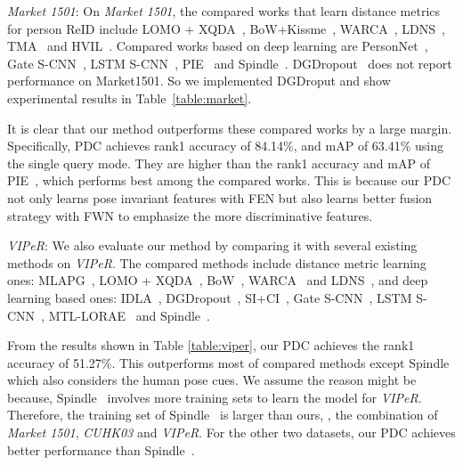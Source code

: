 \documentclass[10pt,twocolumn,letterpaper]{article}
\begin{document}
{\emph{Market 1501}:}
On \emph{Market 1501}, the compared works that learn distance metrics for person ReID include LOMO + XQDA~\cite{liao2015person}, BoW+Kissme~\cite{zheng2015scalable}, WARCA~\cite{jose2016scalable}, LDNS~\cite{zhang2016learning}, TMA~\cite{martinel2016temporal} and HVIL~\cite{wang2016human}. Compared works based on deep learning are
PersonNet~\cite{wu2016personnet}, Gate S-CNN~\cite{varior2016gated}, LSTM S-CNN~\cite{varior2016siamese}, PIE~\cite{zheng2017pose} and Spindle~\cite{zhao2017spindle}. DGDropout~\cite{xiao2016learning} does not report performance on Market1501. So we implemented DGDroput and show experimental results in Table~\ref{table:market}.

It is clear that our method outperforms these compared works by a large margin. Specifically, PDC achieves rank1 accuracy of 84.14\%, and mAP of 63.41\% using the single query mode. They are higher than the rank1 accuracy and mAP of PIE~\cite{zheng2017pose}, which performs best among the compared works. This is because our PDC not only learns pose invariant features with FEN but also learns better fusion strategy with FWN to emphasize the more discriminative features.


{\emph{VIPeR}:} We also evaluate our method by comparing it with several existing methods on \emph{VIPeR}. The compared methods include distance metric learning ones: MLAPG~\cite{liao2015efficient}, LOMO + XQDA~\cite{liao2015person}, BoW~\cite{zheng2015scalable}, WARCA~\cite{jose2016scalable} and LDNS~\cite{zhang2016learning}, and deep learning based ones: IDLA~\cite{ahmed5improved}, DGDropout~\cite{xiao2016learning}, SI+CI~\cite{wangjoint}, Gate S-CNN~\cite{varior2016gated}, LSTM S-CNN~\cite{varior2016siamese}, MTL-LORAE~\cite{su2017multi} and Spindle~\cite{zhao2017spindle}.

From the results shown in Table \ref{table:viper}, our PDC achieves the rank1 accuracy of 51.27\%. This outperforms most of compared methods except Spindle~\cite{zhao2017spindle} which also considers the human pose cues. We assume the reason might be because, Spindle~\cite{zhao2017spindle} involves more training sets to learn the model for \emph{VIPeR}. Therefore, the training set of Spindle~\cite{zhao2017spindle} is larger than ours, \ie, the combination of \emph{Market 1501}, \emph{CUHK03} and \emph{VIPeR}. For the other two datasets, our PDC achieves better performance than Spindle~\cite{zhao2017spindle}.
\end{document}
